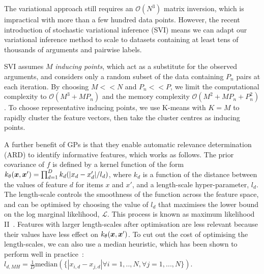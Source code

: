 The variational approach still requires an $\mathcal{O}(N^3)$ matrix inversion,
which is impractical with more than a few hundred data points. 
However, the recent introduction of stochastic variational inference (SVI) 
\cite{hoffman2013stochastic,hensman_scalable_2015}
 means we can adapt our variational inference method
to scale to datasets containing at least tens of thousands of 
arguments and pairwise labels.

SVI assumes $M$ \emph{inducing points},
which act as a substitute for the observed arguments,
and considers only a random subset of the data containing $P_n$ pairs at each iteration. 
By choosing $M << N$ and $P_n << P$, we limit the computational
complexity to $\mathcal{O}(M^3 + MP_n)$ and the 
memory complexity $\mathcal{O}(M^2 + MP_n + P_n^2)$.
To choose representative inducing points, 
we use K-means with $K=M$ to rapidly cluster the feature vectors, 
then take the cluster centres as inducing points.

A further benefit of GPs is that they enable automatic relevance determination (ARD)
to identify informative features, which works as follows.
The prior covariance of $f$ is defined by a kernel function of the form 
$k_{\theta}(\boldsymbol x, \boldsymbol x') = \prod_{d=1}^D k_d(|x_d - x_d'| / l_d)$, 
where $k_d$ is a function of the distance between the values of feature $d$ 
for items $x$ and $x'$, and a length-scale hyper-parameter, $l_d$.
The length-scale controls the smoothness of the function across the feature space,
and can be optimised by choosing the value of $l_d$ that maximises the lower bound on 
the log marginal likelihood, $\mathcal{L}$. 
This process is known as maximum likelihood II~\cite{rasmussen_gaussian_2006}.
Features with larger length-scales after optimisation are less relevant because their values
have less effect on $k_{\theta}(\boldsymbol x, \boldsymbol x') $.
To cut out the cost of optimising the length-scales, we can also use a median heuristic,
which has been shown to perform well in practice~\cite{gretton2012optimal}: 
$ l_{d,MH} = \frac{1}{D} \mathrm{median}( \{ |x_{i,d} - x_{j,d}| \forall i=1,..,N, \forall j=1,...,N\} ) $.

